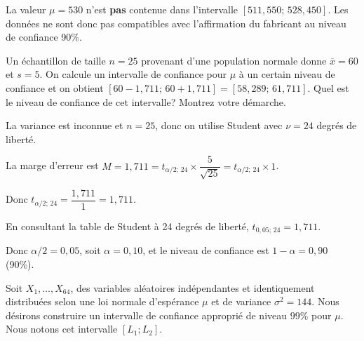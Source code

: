 \begin{questions}
\begin{parts}
\begin{solution}
La valeur $\mu=530$ n'est \textbf{pas} contenue dans l'intervalle $[511{,}550;\, 528{,}450]$. Les données ne sont donc pas compatibles avec l'affirmation du fabricant au niveau de confiance 90\%.
\end{solution}

\end{parts}


\pageblanche

\question[5] Un échantillon de taille $n=25$ provenant d'une population normale donne $\overline{x}=60$ et $s=5$. On calcule un intervalle de confiance pour $\mu$ à un certain niveau de confiance et on obtient $[60-1{,}711;\, 60+1{,}711]=[58{,}289;\, 61{,}711]$. Quel est le niveau de confiance de cet intervalle? Montrez votre démarche.

\begin{solution}
La variance est inconnue et $n=25$, donc on utilise Student avec $\nu=24$ degrés de liberté.

La marge d'erreur est $M=1{,}711=t_{\alpha/2;\,24}\times\dfrac{5}{\sqrt{25}}=t_{\alpha/2;\,24}\times 1$.

Donc $t_{\alpha/2;\,24}=\dfrac{1{,}711}{1}=1{,}711$.

En consultant la table de Student à 24 degrés de liberté, $t_{0{,}05;\,24}=1{,}711$.

Donc $\alpha/2=0{,}05$, soit $\alpha=0{,}10$, et le niveau de confiance est $1-\alpha=0{,}90$ (90\%).
\end{solution}


\pageblanche

\question Soit $X_1,\hdots, X_{64}$, des variables aléatoires indépendantes et identiquement distribuées selon une loi normale d'espérance $\mu$ et de variance $\sigma^2 = 144$. 
Nous désirons construire un intervalle de confiance approprié de niveau $99\%$ pour $\mu$. Nous notons cet intervalle $[L_1;L_2]$.
\end{questions}
